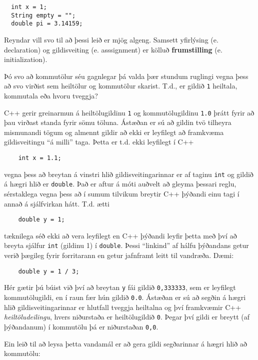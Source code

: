 \begin{verbatim}
  int x = 1;
  String empty = "";
  double pi = 3.14159;
\end{verbatim}
%
Reyndar vill svo til að þessi leið er mjög algeng.
Samsett yfirlýsing (e. declaration) og gildisveiting (e. asssignment) er kölluð {\bf frumstilling} (e. initialization).


Þó svo að kommutölur séu gagnlegar þá valda þær stundum ruglingi vegna þess að svo virðist sem heiltölur og kommutölur skarist. 
T.d., er gildið {\tt 1} heiltala, kommutala eða hvoru tveggja?

C++ gerir greinarmun á heiltölugildinu {\tt 1} og kommutölugildinu {\tt 1.0} þrátt fyrir að þau virðast standa fyrir sömu töluna.
Ástæðan er sú að gildin tvö tilheyra mismunandi tögum og almennt gildir að ekki er leyfilegt að framkvæma gildisveitingu ``á milli'' taga.
Þetta er t.d. ekki leyfilegt í C++

\begin{verbatim}
    int x = 1.1;
\end{verbatim}
%
vegna þess að breytan á vinstri hlið gildisveitingarinnar er af taginu {\tt int} og gildið á hægri hlið er {\tt double}.
Það er aftur á móti auðvelt að gleyma þessari reglu, sérstaklega vegna þess að í sumum tilvikum breytir C++ þýðandi einu tagi í annað á sjálfvirkan hátt.
T.d. ætti 

\begin{verbatim}
    double y = 1;
\end{verbatim}
%
tæknilega séð ekki að vera leyfilegt en C++ þýðandi leyfir þetta með því að breyta sjálfur
{\tt int} (gildinu 1) í {\tt double}.
Þessi ``linkind'' af hálfu þýðandans getur verið þægileg fyrir forritarann en getur jafnframt leitt til vandræða.
Dæmi:

\begin{verbatim}
    double y = 1 / 3;
\end{verbatim}
%
Hér gætir þú búist við því að breytan {\tt y} fái gildið {\tt 0,333333}, sem er leyfilegt kommutölugildi, en í raun fær hún gildið {\tt 0.0}.
Ástæðan er sú að segðin á hægri hlið gildisveitingarinnar er hlutfall tveggja heiltalna og því framkvæmir C++ {\em heiltöludeilingu}, hvers niðurstaða er heiltölugildið {\tt 0}.
Þegar því gildi er breytt (af þýðandanum) í kommutölu þá er niðurstaðan {\tt 0,0}.

Ein leið til að leysa þetta vandamál er að gera gildi segðarinnar á hægri hlið að kommutölu:

